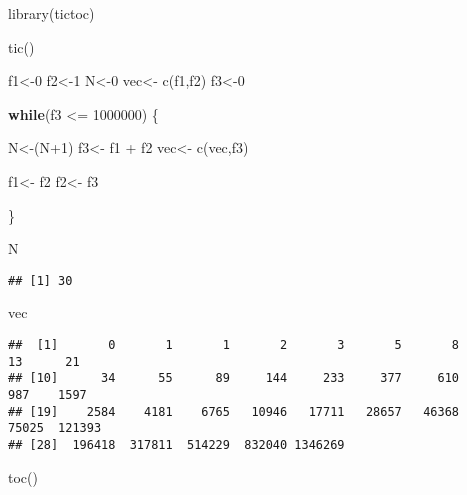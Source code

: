\documentclass[preprint, 3p,
authoryear]{elsarticle} %
\newenvironment{Shaded}{\begin{snugshade}}{\end{snugshade}}
\newcommand{\ControlFlowTok}[1]{\textcolor[rgb]{0.13,0.29,0.53}{\textbf{#1}}}
\newcommand{\DecValTok}[1]{\textcolor[rgb]{0.00,0.00,0.81}{#1}}
\newcommand{\FunctionTok}[1]{\textcolor[rgb]{0.00,0.00,0.00}{#1}}
\newcommand{\NormalTok}[1]{#1}
\newcommand{\OtherTok}[1]{\textcolor[rgb]{0.56,0.35,0.01}{#1}}
\newcommand{\SpecialCharTok}[1]{\textcolor[rgb]{0.00,0.00,0.00}{#1}}
\begin{document}
\begin{Shaded}
\begin{Highlighting}[]
\FunctionTok{library}\NormalTok{(tictoc)}

\FunctionTok{tic}\NormalTok{()}

\NormalTok{f1}\OtherTok{\textless{}{-}}\DecValTok{0}
\NormalTok{f2}\OtherTok{\textless{}{-}}\DecValTok{1}
\NormalTok{N}\OtherTok{\textless{}{-}}\DecValTok{0}
\NormalTok{vec}\OtherTok{\textless{}{-}} \FunctionTok{c}\NormalTok{(f1,f2)}
\NormalTok{f3}\OtherTok{\textless{}{-}}\DecValTok{0}

\ControlFlowTok{while}\NormalTok{(f3 }\SpecialCharTok{\textless{}=} \DecValTok{1000000}\NormalTok{) \{}
  
\NormalTok{  N}\OtherTok{\textless{}{-}}\NormalTok{(N}\SpecialCharTok{+}\DecValTok{1}\NormalTok{)}
\NormalTok{  f3}\OtherTok{\textless{}{-}}\NormalTok{ f1 }\SpecialCharTok{+}\NormalTok{ f2}
\NormalTok{  vec}\OtherTok{\textless{}{-}} \FunctionTok{c}\NormalTok{(vec,f3)}
  
\NormalTok{  f1}\OtherTok{\textless{}{-}}\NormalTok{ f2}
\NormalTok{  f2}\OtherTok{\textless{}{-}}\NormalTok{ f3}
  
\NormalTok{\}}

\NormalTok{N}
\end{Highlighting}
\end{Shaded}

\begin{verbatim}
## [1] 30
\end{verbatim}

\begin{Shaded}
\begin{Highlighting}[]
\NormalTok{vec}
\end{Highlighting}
\end{Shaded}

\begin{verbatim}
##  [1]       0       1       1       2       3       5       8      13      21
## [10]      34      55      89     144     233     377     610     987    1597
## [19]    2584    4181    6765   10946   17711   28657   46368   75025  121393
## [28]  196418  317811  514229  832040 1346269
\end{verbatim}

\begin{Shaded}
\begin{Highlighting}[]
\FunctionTok{toc}\NormalTok{()}
\end{Highlighting}
\end{Shaded}
\end{document}
